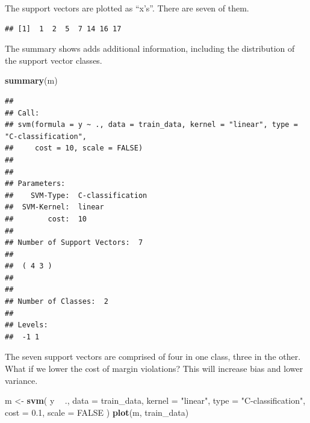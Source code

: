 \documentclass[
]{book}
\newenvironment{Shaded}{\begin{snugshade}}{\end{snugshade}}
\newcommand{\DataTypeTok}[1]{\textcolor[rgb]{0.13,0.29,0.53}{#1}}
\newcommand{\FloatTok}[1]{\textcolor[rgb]{0.00,0.00,0.81}{#1}}
\newcommand{\KeywordTok}[1]{\textcolor[rgb]{0.13,0.29,0.53}{\textbf{#1}}}
\newcommand{\NormalTok}[1]{#1}
\newcommand{\OperatorTok}[1]{\textcolor[rgb]{0.81,0.36,0.00}{\textbf{#1}}}
\newcommand{\OtherTok}[1]{\textcolor[rgb]{0.56,0.35,0.01}{#1}}
\newcommand{\StringTok}[1]{\textcolor[rgb]{0.31,0.60,0.02}{#1}}
\begin{document}
The support vectors are plotted as ``x's''. There are seven of them.

\begin{Shaded}
\end{Shaded}

\begin{verbatim}
## [1]  1  2  5  7 14 16 17
\end{verbatim}

The summary shows adds additional information, including the distribution of the support vector classes.

\begin{Shaded}
\begin{Highlighting}[]
\KeywordTok{summary}\NormalTok{(m)}
\end{Highlighting}
\end{Shaded}

\begin{verbatim}
## 
## Call:
## svm(formula = y ~ ., data = train_data, kernel = "linear", type = "C-classification", 
##     cost = 10, scale = FALSE)
## 
## 
## Parameters:
##    SVM-Type:  C-classification 
##  SVM-Kernel:  linear 
##        cost:  10 
## 
## Number of Support Vectors:  7
## 
##  ( 4 3 )
## 
## 
## Number of Classes:  2 
## 
## Levels: 
##  -1 1
\end{verbatim}

The seven support vectors are comprised of four in one class, three in the other. What if we lower the cost of margin violations? This will increase bias and lower variance.

\begin{Shaded}
\begin{Highlighting}[]
\NormalTok{m <-}\StringTok{ }\KeywordTok{svm}\NormalTok{(}
\NormalTok{  y }\OperatorTok{~}\StringTok{ }\NormalTok{., }
  \DataTypeTok{data =}\NormalTok{ train_data,}
  \DataTypeTok{kernel =} \StringTok{"linear"}\NormalTok{,}
  \DataTypeTok{type =} \StringTok{"C-classification"}\NormalTok{,  }
  \DataTypeTok{cost =} \FloatTok{0.1}\NormalTok{,}
  \DataTypeTok{scale =} \OtherTok{FALSE}
\NormalTok{)}
\KeywordTok{plot}\NormalTok{(m, train_data)}
\end{Highlighting}
\end{Shaded}
\end{document}
